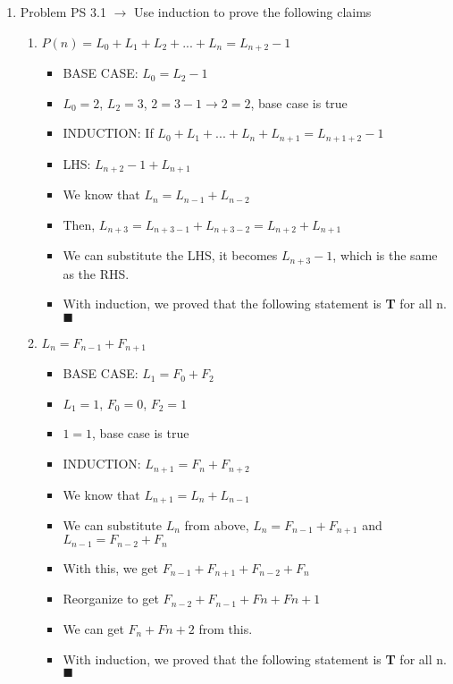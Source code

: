 \documentclass[11pt]{article}
\begin{document}
    \begin{enumerate}
        \item Problem PS 3.1 $\rightarrow$ Use induction to prove the following claims
        \begin{enumerate}
            \item $P(n) = L_0 + L_1 + L_2 + ... + L_n = L_{n+2} - 1$
            \begin{itemize}
                \item BASE CASE: $L_0 = L_2 - 1$
                \item $L_0 = 2$, $L_2 = 3$, $2 = 3-1 \rightarrow 2 = 2$, base case is true
                \item INDUCTION: If $L_0 + L_1 + ... + L_n + L_{n+1} = L_{n+1+2} - 1$
                \item LHS: $L_{n+2} - 1 + L_{n+1}$
                \item We know that $L_n = L_{n-1} + L_{n-2}$
                \item Then, $L_{n+3} = L_{n+3-1} + L_{n+3-2} = L_{n+2} + L_{n+1}$
                \item We can substitute the LHS, it becomes $L_{n+3} -1$, which is the same as the RHS.
                \item With induction, we proved that the following statement is \textbf{T} for all n. $\blacksquare$
            \end{itemize}
            \item $L_n = F_{n-1} + F_{n+1}$
            \begin{itemize}
                \item BASE CASE: $L_1 = F_{0} + F_{2}$
                \item $L_1 = 1$, $F_{0} = 0$, $F_{2} = 1$ 
                \item $1 = 1$, base case is true
                \item INDUCTION: $L_{n+1} = F_n + F_{n+2}$
                \item We know that $L_{n+1} = L_n + L_{n-1}$
                \item We can substitute $L_n$ from above, $L_n = F_{n-1} + F_{n+1}$ and $L_{n-1} = F_{n-2} + F_{n}$
                \item With this, we get $F_{n-1} + F_{n+1} + F_{n-2} + F_{n}$
                \item Reorganize to get $F_{n-2} + F_{n-1} + F{n} + F{n+1}$
                \item We can get $F_{n} + F{n+2}$ from this.
                \item With induction, we proved that the following statement is \textbf{T} for all n. $\blacksquare$

\end{itemize}
\end{enumerate}
\end{enumerate}
\end{document}
